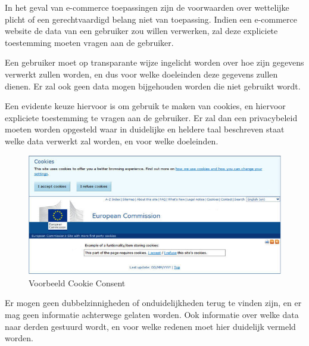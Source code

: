 In het geval van e-commerce toepassingen zijn de voorwaarden over wettelijke plicht of een gerechtvaardigd belang niet van toepassing. Indien een e-commerce website de data van een gebruiker zou willen verwerken, zal deze expliciete toestemming moeten vragen aan de gebruiker.

Een gebruiker moet op transparante wijze ingelicht worden over hoe zijn gegevens verwerkt zullen worden, en dus voor welke doeleinden deze gegevens zullen dienen. Er zal ook geen data mogen bijgehouden worden die niet gebruikt wordt. 

Een evidente keuze hiervoor is om gebruik te maken van cookies, en hiervoor expliciete toestemming te vragen aan de gebruiker. Er zal dan een privacybeleid moeten worden opgesteld waar in duidelijke en heldere taal beschreven staat welke data verwerkt zal worden, en voor welke doeleinden. 

\begin{figure} [h!]
	\centering
	\includegraphics[width=\linewidth]{img/180321-EU-Cookie-Consent-Examples}
	\caption[Voorbeeld Cookie Consent]{Voorbeeld Cookie Consent}
	\label{fig:CookieConsentExample}
\end{figure}



Er mogen geen dubbelzinnigheden of onduidelijkheden terug te vinden zijn, en er mag geen informatie achterwege gelaten worden. Ook informatie over welke data naar derden gestuurd wordt, en voor welke redenen moet hier duidelijk vermeld worden.





